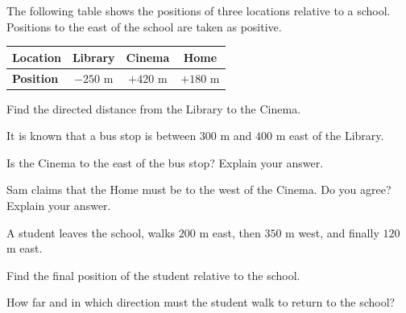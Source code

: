  The following table shows the positions of three locations relative to a school. Positions to the east of the school are taken as positive.

\begin{center}
\begin{tabular}{|l|c|c|c|}
\hline
\textbf{Location} & Library & Cinema & Home \\
\hline
\textbf{Position} & $-250$ m & $+420$ m & $+180$ m \\
\hline
\end{tabular}
\end{center}

\begin{subparts}
  \item Find the directed distance from the Library to the Cinema.

  \item It is known that a bus stop is between $300$ m and $400$ m east of the Library.
  \begin{subpartsii}[1]
    \item Is the Cinema to the east of the bus stop? Explain your answer.
    \item Sam claims that the Home must be to the west of the Cinema. Do you agree? Explain your answer.
  \end{subpartsii}

  \item A student leaves the school, walks $200$ m east, then $350$ m west, and finally $120$ m east.
  \begin{subpartsii}[1]
    \item Find the final position of the student relative to the school.
    \item How far and in which direction must the student walk to return to the school?
  \end{subpartsii}
\end{subparts}

